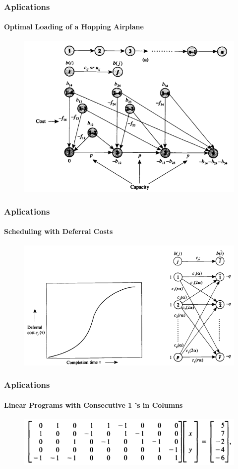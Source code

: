 \documentclass{beamer}
\begin{document}
\begin{frame}
  \frametitle{Aplications}
  \framesubtitle{Optimal Loading of a Hopping
  Airplane}
  \begin{figure}[h!t]
  \centering
  \includegraphics[scale = 0.4 ]{airplaneproblem.png}
  \end{figure}
\end{frame}

\begin{frame}
  \frametitle{Aplications}
  \framesubtitle{Scheduling with Deferral Costs}
\begin{figure}[h!t]
\centering
\includegraphics[scale = 0.4 ]{deferralproblem.png}
\end{figure}  
\end{frame}

\begin{frame}
  \frametitle{Aplications}
  \framesubtitle{Linear Programs with Consecutive 1 's
  in Columns}
  \begin{figure}[h!t]
  \centering
  \includegraphics[scale = 0.5 ]{matrizlinearproblem.png}
  \end{figure}
\end{frame}
\end{document}
